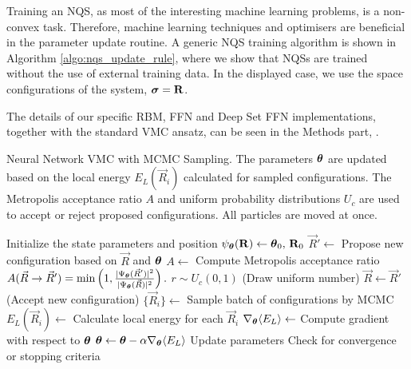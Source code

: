 Training an NQS, as most of the interesting machine learning problems, is a non-convex task. Therefore, machine learning techniques and optimisers are beneficial in the parameter update routine. A generic NQS training algorithm is shown in Algorithm \ref{algo:nqs_update_rule}, where we show that NQSs are trained without the use of external training data. In the displayed case, we use the space configurations of the system, $\boldsymbol{\sigma} = \mathbf{R}$.

The details of our specific RBM, FFN and Deep Set FFN implementations, together with the standard VMC ansatz, can be seen in the Methods part, .

\begin{algorithm}[H]
    \caption{Neural Network VMC with MCMC Sampling. The parameters $\boldsymbol{\theta}$ are updated based on the local energy $E_L(\Vec{R}_i)$ calculated for sampled configurations. The Metropolis acceptance ratio $A$ and uniform probability distributions $U_c$ are used to accept or reject proposed configurations. All particles are moved at once.}
    \label{algo:nqs_update_rule}
    \begin{algorithmic}
        \STATE Initialize the state parameters and position $\psi_{\boldsymbol{\theta}}(\mathbf{R}) \leftarrow \boldsymbol{\theta}_0, \, \mathbf{R}_0$ 
                \STATE $\Vec{R}' \leftarrow$ Propose new configuration based on $\Vec{R}$ and $\boldsymbol{\theta}$
                \STATE $A \leftarrow$ Compute Metropolis acceptance ratio $A(\Vec{R} \rightarrow \Vec{R}') = \min\left(1, \frac{|\Psi_{\boldsymbol{\theta}} (\Vec{R}')|^2}{|\Psi_{\boldsymbol{\theta}}(\Vec{R})|^2}\right).$
                \STATE $r \sim U_c(0,1)$ (Draw uniform number)
                    \STATE $\Vec{R} \leftarrow \Vec{R}'$ (Accept new configuration)
                \ENDIF
            \ENDFOR
            \STATE $\{\Vec{R}_i\} \leftarrow$ Sample batch of configurations by MCMC
            \STATE $E_L(\Vec{R}_i) \leftarrow$ Calculate local energy for each $\Vec{R}_i$
            \STATE $\nabla_{\boldsymbol{\theta}} \langle E_L\rangle \leftarrow$ Compute gradient with respect to $\boldsymbol{\theta}$
            \STATE $\boldsymbol{\theta} \leftarrow \boldsymbol{\theta} - \alpha \nabla_{\boldsymbol{\theta}} \langle E_L\rangle$ Update parameters
            \STATE Check for convergence or stopping criteria
        \ENDFOR
    \end{algorithmic}
\end{algorithm}
